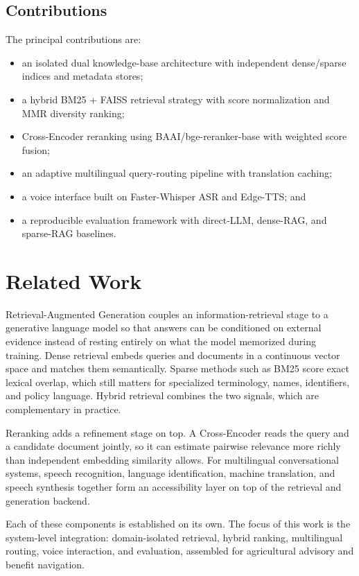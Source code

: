\documentclass[10pt,twocolumn,letterpaper]{article}
\begin{document}
\subsection{Contributions}
The principal contributions are:
\begin{itemize}\itemsep1pt
\item an isolated dual knowledge-base architecture with independent dense/sparse indices and metadata stores;
\item a hybrid BM25 + FAISS retrieval strategy with score normalization and MMR diversity ranking;
\item Cross-Encoder reranking using BAAI/bge-reranker-base with weighted score fusion;
\item an adaptive multilingual query-routing pipeline with translation caching;
\item a voice interface built on Faster-Whisper ASR and Edge-TTS; and
\item a reproducible evaluation framework with direct-LLM, dense-RAG, and sparse-RAG baselines.
\end{itemize}

\section{Related Work}
Retrieval-Augmented Generation couples an information-retrieval stage to a generative language model so that answers can be conditioned on external evidence instead of resting entirely on what the model memorized during training. Dense retrieval embeds queries and documents in a continuous vector space and matches them semantically. Sparse methods such as BM25 score exact lexical overlap, which still matters for specialized terminology, names, identifiers, and policy language. Hybrid retrieval combines the two signals, which are complementary in practice.

Reranking adds a refinement stage on top. A Cross-Encoder reads the query and a candidate document jointly, so it can estimate pairwise relevance more richly than independent embedding similarity allows. For multilingual conversational systems, speech recognition, language identification, machine translation, and speech synthesis together form an accessibility layer on top of the retrieval and generation backend.

Each of these components is established on its own. The focus of this work is the system-level integration: domain-isolated retrieval, hybrid ranking, multilingual routing, voice interaction, and evaluation, assembled for agricultural advisory and benefit navigation.
\end{document}
